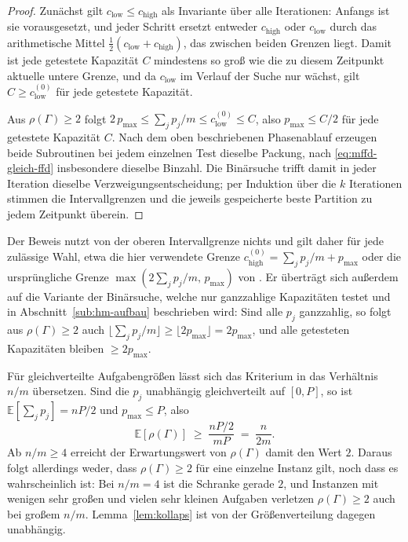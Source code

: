\begin{proof}
Zunächst gilt $c_{\mathrm{low}} \le c_{\mathrm{high}}$ als Invariante über alle Iterationen:
Anfangs ist sie vorausgesetzt, und jeder Schritt ersetzt entweder $c_{\mathrm{high}}$ oder
$c_{\mathrm{low}}$ durch das arithmetische Mittel $\tfrac{1}{2}(c_{\mathrm{low}} + c_{\mathrm{high}})$,
das zwischen beiden Grenzen liegt.
Damit ist jede getestete Kapazität $C$ mindestens so groß wie die zu diesem Zeitpunkt aktuelle
untere Grenze, und da $c_{\mathrm{low}}$ im Verlauf der Suche nur wächst, gilt
$C \ge c_{\mathrm{low}}^{(0)}$ für jede getestete Kapazität.

Aus $\rho(\Gamma) \ge 2$ folgt $2\, p_{\max} \le \sum_j p_j / m \le c_{\mathrm{low}}^{(0)} \le C$, also $p_{\max} \le C/2$ für jede getestete Kapazität $C$.
Nach dem oben beschriebenen Phasenablauf erzeugen beide Subroutinen bei jedem einzelnen Test dieselbe Packung, nach \eqref{eq:mffd-gleich-ffd} insbesondere dieselbe Binzahl.
Die Binärsuche trifft damit in jeder Iteration dieselbe Verzweigungsentscheidung; per Induktion über die $k$ Iterationen stimmen die Intervallgrenzen und die jeweils gespeicherte beste Partition zu jedem Zeitpunkt überein.
\end{proof}

\begin{bemerkung}
Der Beweis nutzt von der oberen Intervallgrenze nichts und gilt daher für jede zulässige
Wahl, etwa die hier verwendete Grenze $c_{\mathrm{high}}^{(0)} = \sum_j p_j/m + p_{\max}$ oder
die ursprüngliche Grenze $\max(2\sum_j p_j/m,\, p_{\max})$ von \textcite{coffman1978}.
Er überträgt sich außerdem auf die Variante der Binärsuche, welche nur ganzzahlige Kapazitäten
testet und in Abschnitt~\ref{sub:hm-aufbau} beschrieben wird:
Sind alle $p_j$ ganzzahlig, so folgt aus $\rho(\Gamma) \ge 2$ auch
$\lfloor \sum_j p_j/m \rfloor \ge \lfloor 2 p_{\max} \rfloor = 2 p_{\max}$,
und alle getesteten Kapazitäten bleiben $\ge 2 p_{\max}$.
\end{bemerkung}

Für gleichverteilte Aufgabengrößen lässt sich das Kriterium in das Verhältnis $n/m$ übersetzen.
Sind die $p_j$ unabhängig gleichverteilt auf $[0, P]$, so ist $\mathbb{E}\!\left[\sum_j p_j\right] = nP/2$ und $p_{\max} \le P$, also
\[
  \mathbb{E}[\rho(\Gamma)] \;\ge\; \frac{nP/2}{mP} \;=\; \frac{n}{2m}.
\]
Ab $n/m \ge 4$ erreicht der Erwartungswert von $\rho(\Gamma)$ damit den Wert $2$.
Daraus folgt allerdings weder, dass $\rho(\Gamma) \ge 2$ für eine einzelne Instanz gilt, noch
dass es wahrscheinlich ist: Bei $n/m = 4$ ist die Schranke gerade $2$, und Instanzen mit wenigen
sehr großen und vielen sehr kleinen Aufgaben verletzen $\rho(\Gamma) \ge 2$ auch bei großem
$n/m$.
Lemma~\ref{lem:kollaps} ist von der Größenverteilung dagegen unabhängig.

